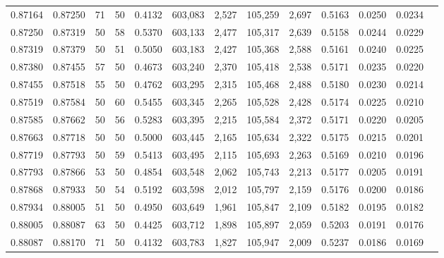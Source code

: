 \begin{tabular}{rrrrrrrrrrrrr}
0.87164 & 0.87250 &    71 &  50 &                                     0.4132 & 603,083 &   2,527 & 105,259 &   2,697 & 0.5163 & 0.0250 & 0.0234 \\
0.87250 & 0.87319 &    50 &  58 &                                     0.5370 & 603,133 &   2,477 & 105,317 &   2,639 & 0.5158 & 0.0244 & 0.0229 \\
0.87319 & 0.87379 &    50 &  51 &                                     0.5050 & 603,183 &   2,427 & 105,368 &   2,588 & 0.5161 & 0.0240 & 0.0225 \\
0.87380 & 0.87455 &    57 &  50 &                                     0.4673 & 603,240 &   2,370 & 105,418 &   2,538 & 0.5171 & 0.0235 & 0.0220 \\
0.87455 & 0.87518 &    55 &  50 &                                     0.4762 & 603,295 &   2,315 & 105,468 &   2,488 & 0.5180 & 0.0230 & 0.0214 \\
0.87519 & 0.87584 &    50 &  60 &                                     0.5455 & 603,345 &   2,265 & 105,528 &   2,428 & 0.5174 & 0.0225 & 0.0210 \\
0.87585 & 0.87662 &    50 &  56 &                                     0.5283 & 603,395 &   2,215 & 105,584 &   2,372 & 0.5171 & 0.0220 & 0.0205 \\
0.87663 & 0.87718 &    50 &  50 &                                     0.5000 & 603,445 &   2,165 & 105,634 &   2,322 & 0.5175 & 0.0215 & 0.0201 \\
0.87719 & 0.87793 &    50 &  59 &                                     0.5413 & 603,495 &   2,115 & 105,693 &   2,263 & 0.5169 & 0.0210 & 0.0196 \\
0.87793 & 0.87866 &    53 &  50 &                                     0.4854 & 603,548 &   2,062 & 105,743 &   2,213 & 0.5177 & 0.0205 & 0.0191 \\
0.87868 & 0.87933 &    50 &  54 &                                     0.5192 & 603,598 &   2,012 & 105,797 &   2,159 & 0.5176 & 0.0200 & 0.0186 \\
0.87934 & 0.88005 &    51 &  50 &                                     0.4950 & 603,649 &   1,961 & 105,847 &   2,109 & 0.5182 & 0.0195 & 0.0182 \\
0.88005 & 0.88087 &    63 &  50 &                                     0.4425 & 603,712 &   1,898 & 105,897 &   2,059 & 0.5203 & 0.0191 & 0.0176 \\
0.88087 & 0.88170 &    71 &  50 &                                     0.4132 & 603,783 &   1,827 & 105,947 &   2,009 & 0.5237 & 0.0186 & 0.0169 \\

\end{tabular}
